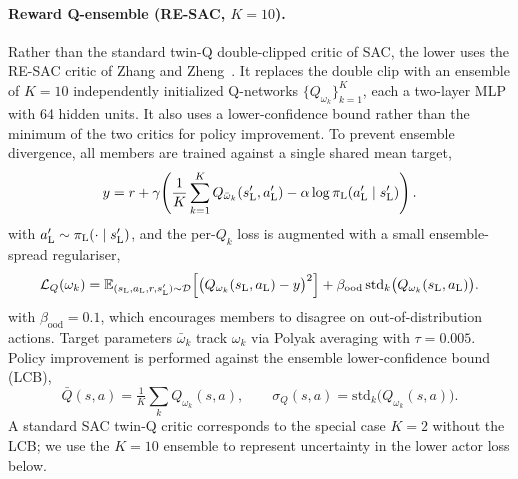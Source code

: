 \paragraph{Reward Q-ensemble (RE-SAC, $K{=}10$).}
Rather than the standard twin-Q double-clipped critic of SAC, the lower uses the RE-SAC critic of Zhang and Zheng~\citep{resac2026}. It replaces the double clip with an ensemble of $K{=}10$ independently initialized Q-networks $\{Q_{\omega_k}\}_{k=1}^{K}$, each a two-layer MLP with 64 hidden units. It also uses a lower-confidence bound rather than the minimum of the two critics for policy improvement. To prevent ensemble divergence, all members are trained against a single shared mean target,
{\footnotesize
\begin{equation}
\label{eq:lower_q_target}
    y = r + \gamma\!\left(\frac{1}{K}\sum_{k=1}^{K}Q_{\bar{\omega}_k}(s_{\mathrm{L}}',a_{\mathrm{L}}') - \alpha\log\pi_{\mathrm{L}}(a_{\mathrm{L}}'\mid s_{\mathrm{L}}')\right).
\end{equation}
}
with $a_{\mathrm{L}}' \sim \pi_{\mathrm{L}}(\cdot \mid s_{\mathrm{L}}')$,
and the per-$Q_k$ loss is augmented with a small ensemble-spread regulariser,
{\footnotesize
\begin{equation}
\label{eq:lower_q_loss}
    \mathcal{L}_Q(\omega_k) = \mathbb{E}_{(s_{\mathrm{L}},a_{\mathrm{L}},r,s_{\mathrm{L}}')\sim\mathcal{D}}\!\left[\bigl(Q_{\omega_k}(s_{\mathrm{L}},a_{\mathrm{L}})-y\bigr)^2\right] + \beta_{\mathrm{ood}}\,\mathrm{std}_k\bigl(Q_{\omega_k}(s_{\mathrm{L}},a_{\mathrm{L}})\bigr).
\end{equation}
}
with $\beta_{\mathrm{ood}} = 0.1$,
which encourages members to disagree on out-of-distribution actions. Target parameters $\bar{\omega}_k$ track $\omega_k$ via Polyak averaging with $\tau = 0.005$. Policy improvement is performed against the ensemble lower-confidence bound (LCB),
\begin{equation}
\label{eq:lower_lcb}
    \bar{Q}(s, a) = \tfrac{1}{K}\sum_{k} Q_{\omega_k}(s, a),\qquad \sigma_Q(s, a) = \mathrm{std}_k\bigl(Q_{\omega_k}(s, a)\bigr).
\end{equation}
A standard SAC twin-Q critic corresponds to the special case $K{=}2$ without the LCB; we use the $K{=}10$ ensemble to represent uncertainty in the lower actor loss below.


